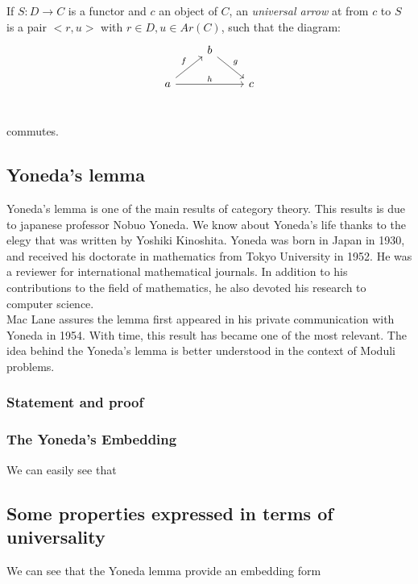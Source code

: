 \begin{definition}
  If $S: D \to C$ is a functor and $c$ an object of $C$, an \emph{universal arrow} at from $c$ to $S$ is a pair $<r,u>$ with $r\in D, u \in Ar(C)$, such that the diagram:
  \[
    \begin{tikzcd}
      & b \arrow[rd, "g"]& \\
      a\arrow[ru, "f"] \arrow[rr, "h"] && c\\
    \end{tikzcd}
  \]

  commutes. 
\end{definition}

\subsection{Yoneda's lemma}
Yoneda's lemma is one of the main results of category theory. This results is due to japanese professor Nobuo Yoneda. We know about Yoneda's life thanks to the elegy that was written by Yoshiki Kinoshita\cite{yonedaLife}. Yoneda was born in Japan in 1930, and received his doctorate in mathematics from Tokyo University in 1952. He was a reviewer for international mathematical journals. In addition to his contributions to the field of mathematics, he also devoted his research to computer science.\\

Mac Lane\cite{mac2013categories} assures the lemma first appeared in his private communication with Yoneda in 1954. With time, this result has became one of the most relevant. The idea behind the Yoneda's lemma is better understood in the context of Moduli problems. 

\subsubsection{Statement and proof}

\subsubsection{The Yoneda's Embedding}
We can easily see that 


\subsection{Some properties expressed in terms of universality}
We can see that the Yoneda lemma provide an embedding form 

